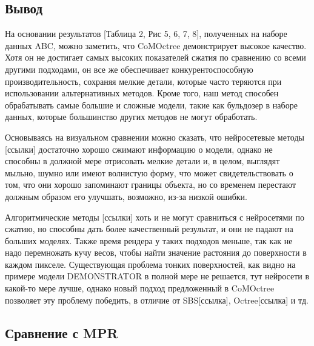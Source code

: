 \documentclass[a4paper,hidelinks,12pt]{article}
\begin{document}
\subsection{Вывод}

На основании результатов [Таблица 2, Рис 5, 6, 7, 8], полученных на наборе данных ABC, можно заметить, 
что CoMOctree демонстрирует высокое качество. Хотя он не достигает самых высоких показателей сжатия по сравнению со 
всеми другими подходами, он все же обеспечивает конкурентоспособную производительность, сохраняя мелкие детали, 
которые часто теряются при использовании альтернативных методов. Кроме того, наш метод способен обрабатывать самые большие 
и сложные модели, такие как бульдозер в наборе данных, которые большинство других методов не могут обработать.

Основываясь на визуальном сравнении можно сказать, что нейросетевые методы [ссылки] достаточно хорошо сжимают информацию о модели, однако не способны в должной мере 
отрисовать мелкие детали и, в целом, выглядят мыльно, шумно или имеют волнистую форму, что может свидетельствовать о том, что они хорошо запоминают границы объекта, но 
со временем перестают должным образом его улучшать, возможно, из-за низкой ошибки.

Алгоритмические методы [ссылки] хоть и не могут сравниться с нейросетями по сжатию, но способны дать более качественный результат, и они не падают на больших моделях. Также время рендера у таких 
подходов меньше, так как не надо перемножать кучу весов, чтобы найти значение растояния до поверхности в каждом пикселе. Существующая проблема тонких поверхностей, как 
видно на примере модели DEMONSTRATOR в полной мере не решается, тут нейросети в какой-то мере лучше, однако новый подход предложенный в CoMOctree позволяет эту 
проблему победить, в отличие от SBS[ссылка], Octree[ссылка] и тд.

\newpage

\subsection{Сравнение с MPR}
\end{document}

